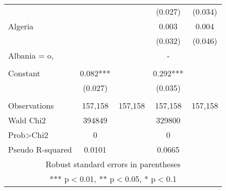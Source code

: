 \documentclass[]{article}
\begin{document}
\begin{tabular}{lcccc}
 &  &  & (0.027) & (0.034) \\
Algeria &  &  & 0.003 & 0.004 \\
 &  &  & (0.032) & (0.046) \\
Albania = o, &  &  & - &  \\
 &  &  &  &  \\
Constant & 0.082*** &  & 0.292*** &  \\
 & (0.027) &  & (0.035) &  \\
 &  &  &  &  \\
Observations & 157,158 & 157,158 & 157,158 & 157,158 \\
Wald Chi2 & 394849 &  & 329800 &  \\
Prob>Chi2 & 0 &  & 0 &  \\
 Pseudo R-squared & 0.0101 &  & 0.0665 &  \\ \hline
\multicolumn{5}{c}{ Robust standard errors in parentheses} \\
\multicolumn{5}{c}{ *** p$<$0.01, ** p$<$0.05, * p$<$0.1} \\
\end{tabular}
\end{document}
